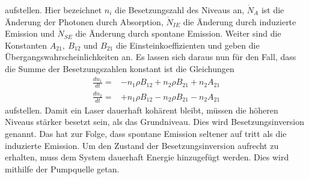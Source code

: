 aufstellen. Hier bezeichnet $n_i$ die Besetzungszahl des Niveaus an, $\dot{N}_A$ ist die Änderung der Photonen durch Absorption, $\dot{N}_{IE}$ die Änderung durch induzierte Emission und $\dot{N}_{SE}$ die Änderung durch spontane Emission.
Weiter sind die Konstanten $A_{21},\ B_{12}$ und $B_{21}$ die Einsteinkoeffizienten und geben die Übergangswahrscheinlichkeiten an.
Es lassen sich daraus nun für den Fall, dass die Summe der Besetzungszahlen konstant ist die Gleichungen
\begin{align}
	\frac{dn_1}{dt}=&-n_1\rho B_{12}+n_2\rho B_{21}+n_2A_{21}\\
	\frac{dn_2}{dt}=&+n_1\rho B_{12}- n_2\rho B_{21}-n_2A_{21}
\end{align}
aufstellen.
Damit ein Laser dauerhaft kohärent bleibt, müssen die höheren Niveaus stärker besetzt sein, als das Grundniveau.
Dies wird Besetzungsinversion genannt. 
Das hat zur Folge, dass spontane Emission seltener auf tritt als die induzierte  Emission.
Um den Zustand der Besetzungsinversion aufrecht zu erhalten, muss dem System dauerhaft Energie hinzugefügt werden.
Dies wird mithilfe der Pumpquelle getan.
